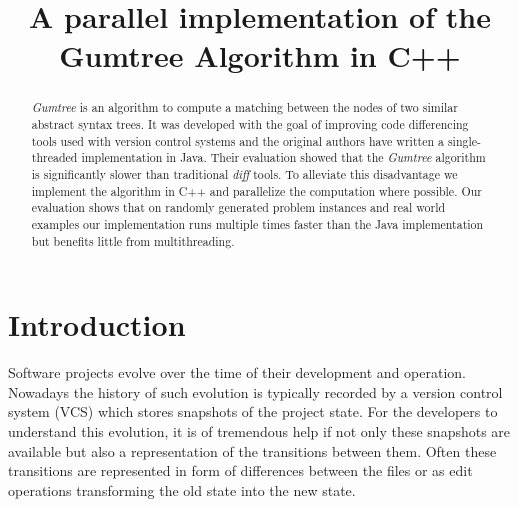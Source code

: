 \documentclass[letterpaper]{article}
\title{A parallel implementation of the Gumtree Algorithm in C++}
\begin{document}
%
\maketitle
%

\begin{abstract}

\emph{Gumtree} is an algorithm to compute a matching between the nodes of two similar abstract syntax trees.
It was developed with the goal of improving code differencing tools used with version control systems and the original authors have written a single-threaded implementation in Java.
Their evaluation showed that the \emph{Gumtree} algorithm is significantly slower than traditional \emph{diff} tools.
To alleviate this disadvantage we implement the algorithm in C++ and parallelize the computation where possible.
Our evaluation shows that on randomly generated problem instances and real world examples our implementation runs multiple times faster than the Java implementation but benefits little from multithreading.
\end{abstract}

\section{Introduction}\label{sec:intro}


Software projects evolve over the time of their development and operation.
Nowadays the history of such evolution is typically recorded by a version control system (VCS) which stores snapshots of the project state.
For the developers to understand this evolution, it is of tremendous help if not only these snapshots are available but also a representation of the transitions between them.
Often these transitions are represented in form of differences between the files or as edit operations transforming the old state into the new state.
\end{document}
